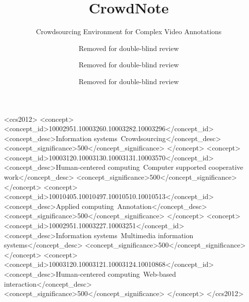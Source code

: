 \documentclass[sigconf]{acmart}
\begin{document}
\title{CrowdNote}
\subtitle{Crowdsourcing Environment for Complex Video Annotations}


\author{Removed for double-blind review}

\author{Removed for double-blind review}

\author{Removed for double-blind review}



\renewcommand{\shortauthors}{Removed for double-blind review}


\begin{abstract}
	
\end{abstract}

%
%
\begin{CCSXML}
<ccs2012>
<concept>
<concept_id>10002951.10003260.10003282.10003296</concept_id>
<concept_desc>Information systems~Crowdsourcing</concept_desc>
<concept_significance>500</concept_significance>
</concept>
<concept>
<concept_id>10003120.10003130.10003131.10003570</concept_id>
<concept_desc>Human-centered computing~Computer supported cooperative work</concept_desc>
<concept_significance>500</concept_significance>
</concept>
<concept>
<concept_id>10010405.10010497.10010510.10010513</concept_id>
<concept_desc>Applied computing~Annotation</concept_desc>
<concept_significance>500</concept_significance>
</concept>
<concept>
<concept_id>10002951.10003227.10003251</concept_id>
<concept_desc>Information systems~Multimedia information systems</concept_desc>
<concept_significance>500</concept_significance>
</concept>
<concept>
<concept_id>10003120.10003121.10003124.10010868</concept_id>
<concept_desc>Human-centered computing~Web-based interaction</concept_desc>
<concept_significance>500</concept_significance>
</concept>
</ccs2012>
\end{CCSXML}
\end{document}
